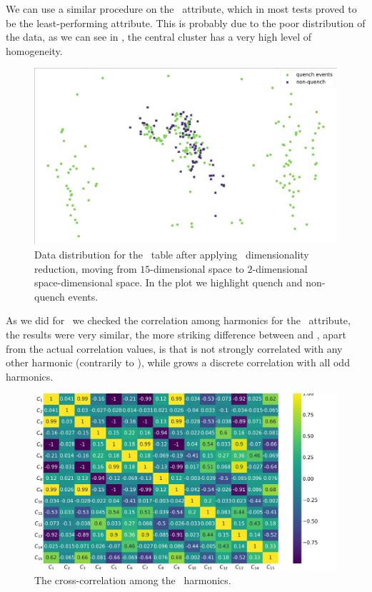 \subsubsection{\bn}
We can use a similar procedure on the \bn\ attribute, which in most tests proved to be the
least-performing attribute. This is probably due to the poor distribution of the data, as we can see in
, the central cluster has a very high level of homogeneity.
\begin{figure}[!ht]
	\centering
	\includegraphics[width=\linewidth]{img/Bn_distribution.png}
	\caption{Data distribution for the \bn\ table after applying \pca\ dimensionality
		reduction, moving from $15$-dimensional space to $2$-dimensional space-dimensional
		space. In the plot we highlight quench and non-quench events.} \label{fig:bn-dist}
\end{figure}

As we did for \an\ we checked the correlation among harmonics for the \bn\ attribute, the results
were very similar, the more striking difference between  and ,
apart from the actual correlation values, is that \bn[2] is not strongly correlated with any other
harmonic (contrarily to \an[2]), while \bn[15] grows a discrete correlation with all odd harmonics.
\begin{figure}[!ht]
	\centering
	\includegraphics[width=\linewidth]{img/Bn_corr_matrix.png}
	\caption{The cross-correlation among the \bn\ harmonics.} \label{fig:bn-corr}
\end{figure}

